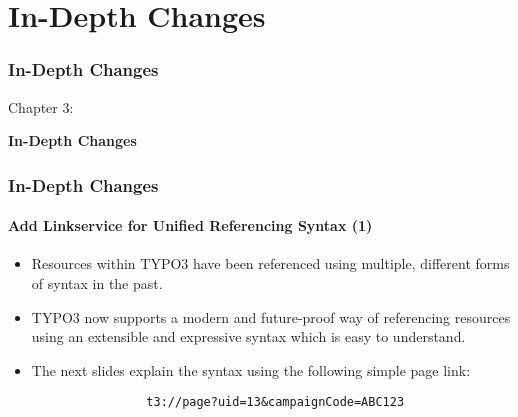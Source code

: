 %

\section{In-Depth Changes}
\begin{frame}[fragile]
	\frametitle{In-Depth Changes}

	\begin{center}\huge{Chapter 3:}\end{center}
	\begin{center}\huge{\color{typo3darkgrey}\textbf{In-Depth Changes}}\end{center}

\end{frame}

\begin{frame}[fragile]
	\frametitle{In-Depth Changes}
	\framesubtitle{Add Linkservice for Unified Referencing Syntax (1)}

	\begin{itemize}

		\item Resources within TYPO3 have been referenced using multiple, different forms of syntax in the past.

		\item TYPO3 now supports a modern and future-proof way of referencing resources using an extensible and
			expressive syntax which is easy to understand.

		\item The next slides explain the syntax using the following simple page link:

			\begin{lstlisting}
				t3://page?uid=13&campaignCode=ABC123
			\end{lstlisting}

	\end{itemize}

\end{frame}


